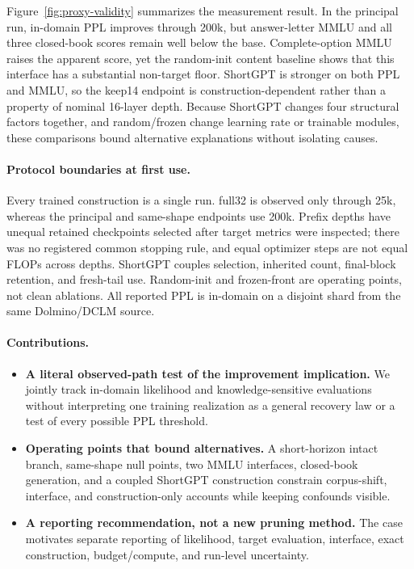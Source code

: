 Figure~\ref{fig:proxy-validity} summarizes the measurement result. In the
principal run, in-domain PPL improves through 200k, but answer-letter MMLU and
all three closed-book scores remain well below the base. Complete-option MMLU
raises the apparent score, yet the random-init content baseline shows that this
interface has a substantial non-target floor. ShortGPT is stronger on both PPL
and MMLU, so the keep14 endpoint is construction-dependent rather than a
property of nominal 16-layer depth. Because ShortGPT changes four structural
factors together, and random/frozen change learning rate or trainable modules,
these comparisons bound alternative explanations without isolating causes.

\paragraph{Protocol boundaries at first use.}
Every trained construction is a single run. full32 is observed only through
25k, whereas the principal and same-shape endpoints use 200k. Prefix depths
have unequal retained checkpoints selected after target metrics were inspected;
there was no registered common stopping rule, and equal optimizer steps are not
equal FLOPs across depths. ShortGPT couples selection, inherited count,
final-block retention, and fresh-tail use. Random-init and frozen-front are
operating points, not clean ablations. All reported PPL is in-domain on a
disjoint shard from the same Dolmino/DCLM source.

\paragraph{Contributions.}
\begin{itemize}[leftmargin=1.2em,itemsep=2pt]
\item \textbf{A literal observed-path test of the improvement implication.} We
jointly track in-domain likelihood and knowledge-sensitive evaluations without
interpreting one training realization as a general recovery law or a test of
every possible PPL threshold.
\item \textbf{Operating points that bound alternatives.} A short-horizon intact
branch, same-shape null points, two MMLU interfaces, closed-book generation, and
a coupled ShortGPT construction constrain corpus-shift, interface, and
construction-only accounts while keeping confounds visible.
\item \textbf{A reporting recommendation, not a new pruning method.} The case
motivates separate reporting of likelihood, target evaluation, interface,
exact construction, budget/compute, and run-level uncertainty.
\end{itemize}

